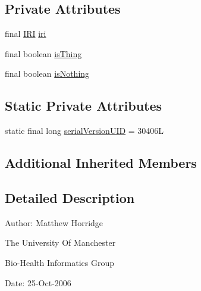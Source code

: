 \subsection*{Private Attributes}
\begin{DoxyCompactItemize}
\item 
final \hyperlink{classorg_1_1semanticweb_1_1owlapi_1_1model_1_1_i_r_i}{I\-R\-I} \hyperlink{classuk_1_1ac_1_1manchester_1_1cs_1_1owl_1_1owlapi_1_1_o_w_l_class_impl_a3e4de46ba2ab5b144c1b28f1d136a97e}{iri}
\item 
final boolean \hyperlink{classuk_1_1ac_1_1manchester_1_1cs_1_1owl_1_1owlapi_1_1_o_w_l_class_impl_a175220d8e5e7fcbc6b39561a95837a5e}{is\-Thing}
\item 
final boolean \hyperlink{classuk_1_1ac_1_1manchester_1_1cs_1_1owl_1_1owlapi_1_1_o_w_l_class_impl_a8204c4c17a5153c0a95825424292d9d4}{is\-Nothing}
\end{DoxyCompactItemize}
\subsection*{Static Private Attributes}
\begin{DoxyCompactItemize}
\item 
static final long \hyperlink{classuk_1_1ac_1_1manchester_1_1cs_1_1owl_1_1owlapi_1_1_o_w_l_class_impl_a01ea36a9cf2e782b1d5b058e43b73c7f}{serial\-Version\-U\-I\-D} = 30406\-L
\end{DoxyCompactItemize}
\subsection*{Additional Inherited Members}


\subsection{Detailed Description}
Author\-: Matthew Horridge\par
 The University Of Manchester\par
 Bio-\/\-Health Informatics Group\par
 Date\-: 25-\/\-Oct-\/2006\par
 \par
 

